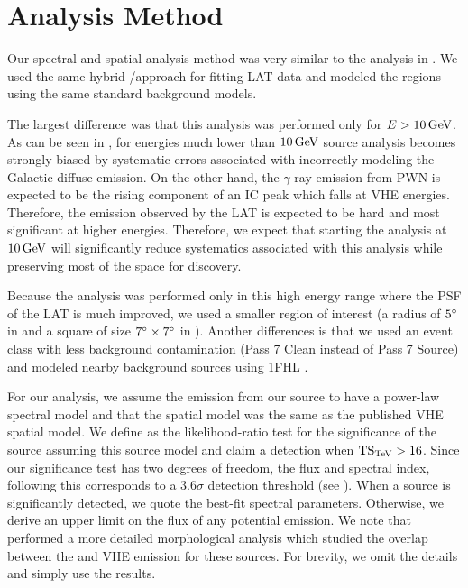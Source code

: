 \section{Analysis Method} 

Our spectral and spatial analysis method was very similar to the analysis
in . We used the same hybrid \pointlike/\gtlike approach
for fitting \ac{LAT} data and modeled the regions using the same standard
background models.

The largest difference was that this analysis was performed only for
$E>10\,\text{GeV}$.  As can be seen in ,
for energies much lower than $10\,\text{GeV}$ source analysis becomes
strongly biased by systematic errors associated with incorrectly modeling
the Galactic-diffuse emission.  On the other hand, the $\gamma$-ray
emission from \ac{PWN} is expected to be the rising component of an
\ac{IC} peak which falls at \ac{VHE} energies. Therefore, the emission
observed by the \ac{LAT} is expected to be hard and most significant
at higher energies. Therefore, we expect that starting the analysis  at
$10\,\text{GeV}$ will significantly reduce systematics associated with
this analysis while preserving most of the space for discovery.

Because the analysis was performed only in this high energy range where
the \ac{PSF} of the \ac{LAT} is much improved, we used a smaller region
of interest (a radius of $5^\circ$ in \pointlike and a square of size
$7^\circ\times7^\circ$ in \gtlike).  Another differences is that we
used an event class with less background contamination (Pass 7 Clean
instead of Pass 7 Source) and modeled nearby background sources using
\ac{1FHL} \citep{ackermann_2013a_first-fermi-lat}.

For our analysis, we assume the \gev emission from our source to have
a power-law spectral model and that the \gev spatial model was the
same as the published \ac{VHE} spatial model.  We define \tstev as
the likelihood-ratio test for the significance of the source assuming
this source model and claim a detection when $\mathrm{TS}_\text{TeV} > 16$.  Since our
significance test has two degrees of freedom, the flux and spectral
index, following this corresponds to a $3.6\sigma$ detection threshold
(see ). When a source is significantly
detected, we quote the best-fit spectral parameters.  Otherwise, we
derive an upper limit on the flux of any potential emission.  We note
that \cite{acero_2013a_constraints-galactic} performed a more detailed
morphological analysis which studied the overlap between the \gev and
\ac{VHE} emission for these sources. For brevity, we omit the details
and simply use the results.

